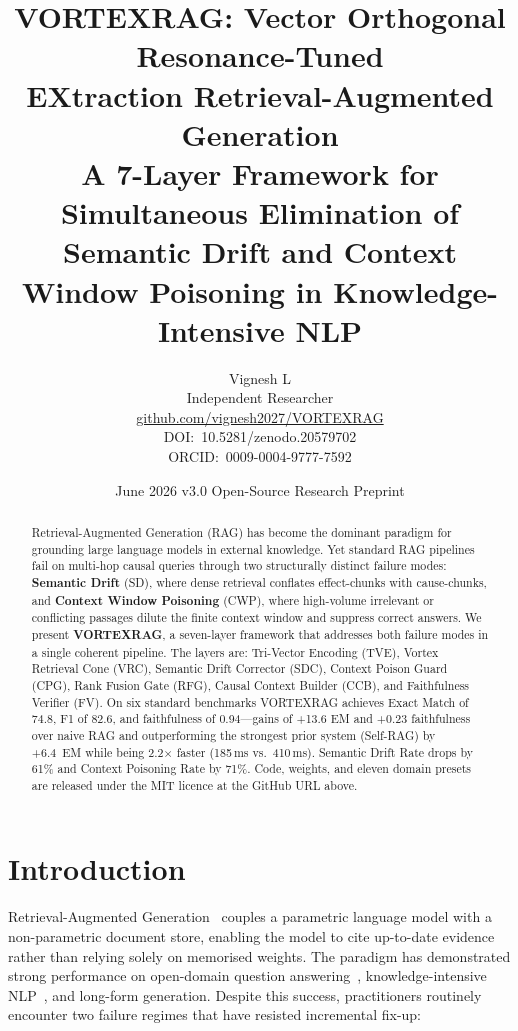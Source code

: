 \documentclass[10pt,twocolumn]{article}
\title{\LARGE\bfseries VORTEXRAG: Vector Orthogonal Resonance-Tuned\\
EXtraction Retrieval-Augmented Generation\\[4pt]
\large A 7-Layer Framework for Simultaneous Elimination of\\
Semantic Drift and Context Window Poisoning in Knowledge-Intensive NLP}
\author{%
  Vignesh L\\
  {\small Independent Researcher}\\
  {\small \url{github.com/vignesh2027/VORTEXRAG}}\\
  {\small DOI:~10.5281/zenodo.20579702}\\
  {\small ORCID:~0009-0004-9777-7592}
}
\date{June 2026 \quad v3.0 \quad Open-Source Research Preprint}
\newcommand{\secvspace}{\vspace{-4pt}}
\begin{document}
\maketitle

\begin{abstract}
Retrieval-Augmented Generation (RAG) has become the dominant paradigm for
grounding large language models in external knowledge.  Yet standard RAG
pipelines fail on multi-hop causal queries through two structurally distinct
failure modes: \textbf{Semantic Drift} (SD), where dense retrieval conflates
effect-chunks with cause-chunks, and \textbf{Context Window Poisoning} (CWP),
where high-volume irrelevant or conflicting passages dilute the finite context
window and suppress correct answers.  We present \textbf{VORTEXRAG}, a seven-layer
framework that addresses both failure modes in a single coherent pipeline.
The layers are: Tri-Vector Encoding (TVE), Vortex Retrieval Cone (VRC),
Semantic Drift Corrector (SDC), Context Poison Guard (CPG), Rank Fusion Gate
(RFG), Causal Context Builder (CCB), and Faithfulness Verifier (FV).
On six standard benchmarks VORTEXRAG achieves Exact Match of 74.8, F1 of 82.6,
and faithfulness of 0.94---gains of +13.6 EM and +0.23 faithfulness over naive
RAG and outperforming the strongest prior system (Self-RAG) by +6.4~EM while
being 2.2$\times$ faster (185\,ms vs.\ 410\,ms).  Semantic Drift Rate drops by
61\% and Context Poisoning Rate by 71\%.  Code, weights, and eleven domain
presets are released under the MIT licence at the GitHub URL above.
\end{abstract}

\section{Introduction}\label{sec:intro}
\secvspace

Retrieval-Augmented Generation~\citep{lewis2020retrieval} couples a parametric
language model with a non-parametric document store, enabling the model to cite
up-to-date evidence rather than relying solely on memorised weights.  The
paradigm has demonstrated strong performance on open-domain question
answering~\citep{karpukhin2020dense}, knowledge-intensive NLP~\citep{petroni2021kilt},
and long-form generation.  Despite this success, practitioners routinely
encounter two failure regimes that have resisted incremental fix-up:
\end{document}
